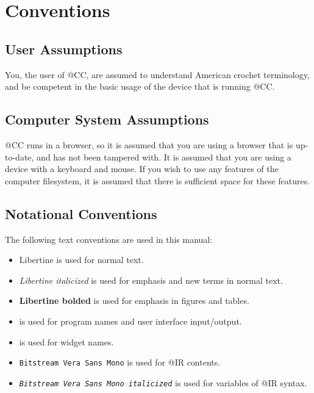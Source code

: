 \documentclass[main.tex]{subfiles}
\begin{document}
\chapter{Conventions}\label{chp:conventions}

\section{User Assumptions}

You, the user of @CC, are assumed to understand American crochet terminology, and be competent in the basic usage of the device that is running @CC.

\section{Computer System Assumptions}\label{sec:csassumptions}

@CC runs in a browser, so it is assumed that you are using a browser that is up-to-date, and has not been tampered with. It is assumed that you are using a device with a keyboard and mouse. If you wish to use any features of the computer filesystem, it is assumed that there is sufficient space for these features.

\section{Notational Conventions}

The following text conventions are used in this manual:

\begin{itemize}
\item Libertine is used for normal text.
\item \emph{Libertine italicized} is used for emphasis and new terms in normal text.
\item \textbf{Libertine bolded} is used for emphasis in figures and tables.
\item {} is used for program names and user interface input/output.
\item {} is used for widget names.
\item \Verb`Bitstream Vera Sans Mono` is used for @IR contents.
\item \emph{\Verb`Bitstream Vera Sans Mono italicized`} is used for variables of @IR syntax.
\end{itemize}
\end{document}
